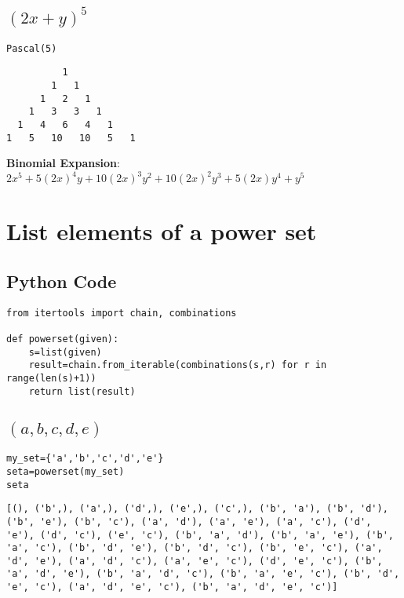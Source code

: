 \documentclass[11pt]{article}
\begin{document}
\subsection{\((2x+y)^5\)}
\label{sec:org5aa5b05}
\begin{verbatim}
Pascal(5)
\end{verbatim}

\begin{verbatim}
          1   
        1   1   
      1   2   1   
    1   3   3   1   
  1   4   6   4   1   
1   5   10   10   5   1   
\end{verbatim}

\textbf{Binomial Expansion}:
\(2x^{5}+5(2x)^{4}y+10(2x)^{3}y^{2}+10(2x)^{2}y^{3}+5(2x)y^{4}+y^{5}\)

\section{List elements of a power set}
\label{sec:org687985e}

\subsection{Python Code}
\label{sec:org7cf8464}
\begin{verbatim}
from itertools import chain, combinations

def powerset(given):
    s=list(given)
    result=chain.from_iterable(combinations(s,r) for r in range(len(s)+1))
    return list(result)
\end{verbatim}

\subsection{\((a,b,c,d,e)\)}
\label{sec:orgeff0416}
\begin{verbatim}
my_set={'a','b','c','d','e'}
seta=powerset(my_set)
seta
\end{verbatim}

\begin{verbatim}
[(), ('b',), ('a',), ('d',), ('e',), ('c',), ('b', 'a'), ('b', 'd'), ('b', 'e'), ('b', 'c'), ('a', 'd'), ('a', 'e'), ('a', 'c'), ('d', 'e'), ('d', 'c'), ('e', 'c'), ('b', 'a', 'd'), ('b', 'a', 'e'), ('b', 'a', 'c'), ('b', 'd', 'e'), ('b', 'd', 'c'), ('b', 'e', 'c'), ('a', 'd', 'e'), ('a', 'd', 'c'), ('a', 'e', 'c'), ('d', 'e', 'c'), ('b', 'a', 'd', 'e'), ('b', 'a', 'd', 'c'), ('b', 'a', 'e', 'c'), ('b', 'd', 'e', 'c'), ('a', 'd', 'e', 'c'), ('b', 'a', 'd', 'e', 'c')]
\end{verbatim}
\end{document}
